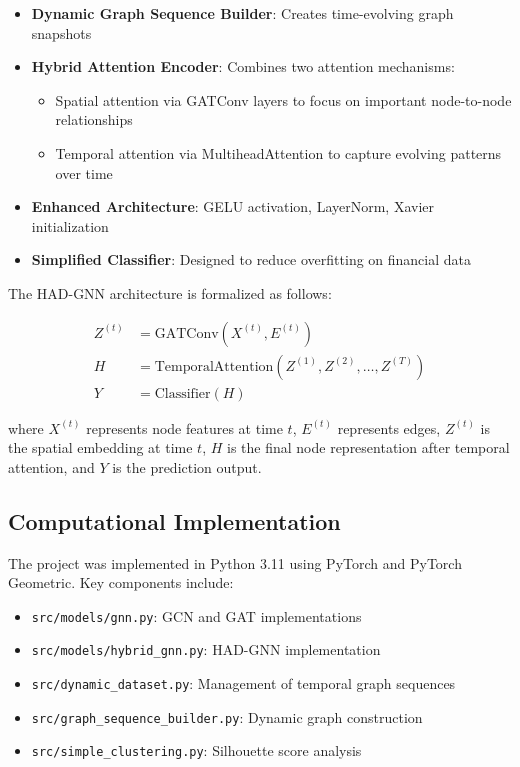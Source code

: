 \documentclass[12pt]{article}
\begin{document}
\begin{itemize}
    \item \textbf{Dynamic Graph Sequence Builder}: Creates time-evolving graph snapshots
    \item \textbf{Hybrid Attention Encoder}: Combines two attention mechanisms:
    \begin{itemize}
        \item Spatial attention via GATConv layers to focus on important node-to-node relationships
        \item Temporal attention via MultiheadAttention to capture evolving patterns over time
    \end{itemize}
    \item \textbf{Enhanced Architecture}: GELU activation, LayerNorm, Xavier initialization
    \item \textbf{Simplified Classifier}: Designed to reduce overfitting on financial data
\end{itemize}

The HAD-GNN architecture is formalized as follows:

\begin{equation}
\begin{split}
Z^{(t)} &= \text{GATConv}(X^{(t)}, E^{(t)}) \\
H &= \text{TemporalAttention}(Z^{(1)}, Z^{(2)}, \ldots, Z^{(T)}) \\
Y &= \text{Classifier}(H)
\end{split}
\end{equation}

where $X^{(t)}$ represents node features at time $t$, $E^{(t)}$ represents edges, $Z^{(t)}$ is the spatial embedding at time $t$, $H$ is the final node representation after temporal attention, and $Y$ is the prediction output.

\subsection{Computational Implementation}

The project was implemented in Python 3.11 using PyTorch and PyTorch Geometric. Key components include:

\begin{itemize}
    \item \texttt{src/models/gnn.py}: GCN and GAT implementations
    \item \texttt{src/models/hybrid\_gnn.py}: HAD-GNN implementation 
    \item \texttt{src/dynamic\_dataset.py}: Management of temporal graph sequences
    \item \texttt{src/graph\_sequence\_builder.py}: Dynamic graph construction
    \item \texttt{src/simple\_clustering.py}: Silhouette score analysis
\end{itemize}
\end{document}
